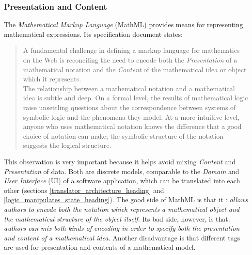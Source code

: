 %
%
%
%
%
%
%

\subsubsection{Presentation and Content}
\label{presentation_and_content_heading}

The \emph{Mathematical Markup Language} (MathML) \cite{mathml} provides means
for representing mathematical expressions. Its specification document states:

\begin{quote}
    A fundamental challenge in defining a markup language for mathematics on
    the Web is reconciling the need to encode both the \emph{Presentation} of a
    mathematical notation and the \emph{Content} of the mathematical idea or
    object which it represents.\\
    The relationship between a mathematical notation and a mathematical idea is
    subtle and deep. On a formal level, the results of mathematical logic raise
    unsettling questions about the correspondence between systems of symbolic
    logic and the phenomena they model. At a more intuitive level, anyone who
    uses mathematical notation knows the difference that a good choice of
    notation can make; the symbolic structure of the notation suggests the
    logical structure.
\end{quote}

This observation is very important because it helps avoid mixing \emph{Content}
and \emph{Presentation} of data. Both are discrete models, comparable to the
\emph{Domain} and \emph{User Interface} (UI) of a software application, which
can be translated into each other (sections \ref{translator_architecture_heading}
and \ref{logic_manipulates_state_heading}). The good side of MathML is that it
\cite{mathml}: \textit{allows authors to encode both the notation which
represents a mathematical object and the mathematical structure of the object
itself.} Its bad side, however, is that: \textit{authors can mix both kinds of
encoding in order to specify both the presentation and content of a
mathematical idea.} Another disadvantage is that different tags are used for
presentation and contents of a mathematical model.

